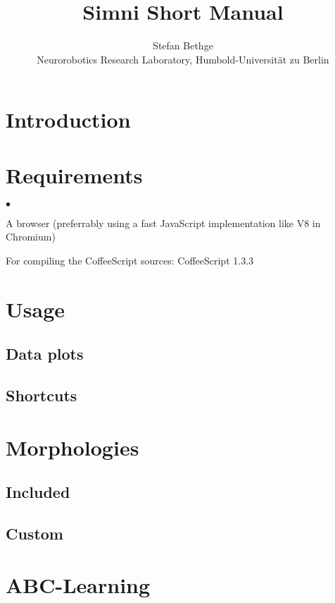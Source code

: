 \documentclass[10pt,a4paper]{article}
\begin{document}
\title{Simni Short Manual}
\author{Stefan Bethge\\
Neurorobotics Research Laboratory, Humbold-Universität zu Berlin}

\maketitle
\tableofcontents
\newpage
{}

\section{Introduction}

\section{Requirements}

\begin{list}{$\bullet$}
\item A browser (preferrably using a fast JavaScript implementation like V8 in Chromium)
\item For compiling the CoffeeScript sources: CoffeeScript 1.3.3
\end{list}

\section{Usage}
\subsection{Data plots}
\subsection{Shortcuts}


\section{Morphologies}
\subsection{Included}
\subsection{Custom}

\section{ABC-Learning}
\end{document}
